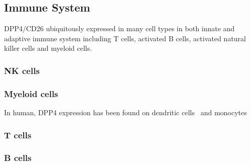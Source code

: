 \subsection{Immune System}
DPP4/CD26 ubiquitously expressed in many cell types in both innate and adaptive immune system including T cells, activated B cells, activated natural killer cells and myeloid cells.~\cite{Abbott1994,Shingu2003,Hong1989,Gutschmidt1981,Dikov2004,Bühling1995,Tanaka1992,Gorrell1991}  

\subsubsection{NK cells}

\subsubsection{Myeloid cells}
In human, DPP4 expression has been found on dendritic cells~\cite{Zhong2013,Gliddon2002,Epardaud2004} and monocytes

\subsubsection{T cells}
\subsubsection{B cells}
